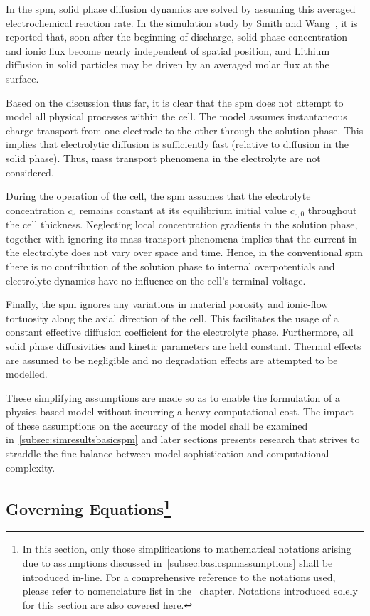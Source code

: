 In the  \gls{spm}, solid phase  diffusion dynamics  are solved by  assuming this
averaged electrochemical  reaction rate.  In the simulation  study by  Smith and
Wang~\cite{Smith2006},  it  is  reported  that,  soon  after  the  beginning  of
discharge, solid phase concentration and ionic flux become nearly independent of
spatial position, and  Lithium diffusion in solid particles may  be driven by an
averaged molar flux at the surface.


Based  on the  discussion thus  far, it  is clear  that the  \gls{spm} does  not
attempt  to model  all physical  processes within  the cell.  The model  assumes
instantaneous  charge transport  from one  electrode  to the  other through  the
solution phase.  This implies that  electrolytic diffusion is  sufficiently fast
(relative to  diffusion in the solid  phase). Thus, mass transport  phenomena in
the electrolyte are not considered.


During the  operation of the  cell, the  \gls{spm} assumes that  the electrolyte
concentration  $c_\text{e}$ remains  constant at  its equilibrium  initial value
$c_{\text{e},0}$ throughout  the cell thickness. Neglecting  local concentration
gradients  in the  solution phase,  together  with ignoring  its mass  transport
phenomena implies that  the current in the electrolyte does  not vary over space
and time. Hence,  in the conventional \gls{spm} there is  no contribution of the
solution  phase to  internal  overpotentials and  electrolyte  dynamics have  no
influence on the cell's terminal voltage.


Finally,  the  \gls{spm}  ignores  any   variations  in  material  porosity  and
ionic-flow tortuosity  along the axial  direction of the cell.  This facilitates
the  usage of  a constant  effective diffusion  coefficient for  the electrolyte
phase. Furthermore,  all solid  phase diffusivities  and kinetic  parameters are
held constant. Thermal  effects are assumed to be negligible  and no degradation
effects are attempted to be modelled.


These  simplifying assumptions  are  made so  as to  enable  the formulation  of
a  physics-based  model  without  incurring  a  heavy  computational  cost.  The
impact  of these  assumptions on  the accuracy  of the  model shall  be examined
in~\cref{subsec:simresultsbasicspm}  and later  sections presents  research that
strives  to  straddle   the  fine  balance  between   model  sophistication  and
computational complexity.


\subsection[Governing  Equations]{Governing  Equations\protect\footnote{In  this
section,   only  those   simplifications  to   mathematical  notations   arising
due  to  assumptions  discussed  in~\cref{subsec:basicspmassumptions}  shall  be
introduced   in-line.   For  a   comprehensive   reference   to  the   notations
used,   please  refer   to   nomenclature   list  in   the~
chapter.  Notations  introduced  solely  for   this  section  are  also  covered
here.}}\label{subsec:basicspmgoverningeqns}


